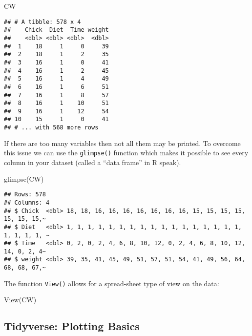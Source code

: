 \documentclass[
]{book}
\newenvironment{Shaded}{\begin{snugshade}}{\end{snugshade}}
\newcommand{\FunctionTok}[1]{\textcolor[rgb]{0.00,0.00,0.00}{#1}}
\newcommand{\NormalTok}[1]{#1}
\begin{document}
\begin{Shaded}
\begin{Highlighting}[]
\NormalTok{CW}
\end{Highlighting}
\end{Shaded}

\begin{verbatim}
## # A tibble: 578 x 4
##    Chick  Diet  Time weight
##    <dbl> <dbl> <dbl>  <dbl>
##  1    18     1     0     39
##  2    18     1     2     35
##  3    16     1     0     41
##  4    16     1     2     45
##  5    16     1     4     49
##  6    16     1     6     51
##  7    16     1     8     57
##  8    16     1    10     51
##  9    16     1    12     54
## 10    15     1     0     41
## # ... with 568 more rows
\end{verbatim}

If there are too many variables then not all them may be printed. To overcome this issue
we can use the \texttt{glimpse()} function which makes it possible to see every column in your
dataset (called a ``data frame'' in R speak).

\begin{Shaded}
\begin{Highlighting}[]
\FunctionTok{glimpse}\NormalTok{(CW)}
\end{Highlighting}
\end{Shaded}

\begin{verbatim}
## Rows: 578
## Columns: 4
## $ Chick  <dbl> 18, 18, 16, 16, 16, 16, 16, 16, 16, 15, 15, 15, 15, 15, 15, 15,~
## $ Diet   <dbl> 1, 1, 1, 1, 1, 1, 1, 1, 1, 1, 1, 1, 1, 1, 1, 1, 1, 1, 1, 1, 1, ~
## $ Time   <dbl> 0, 2, 0, 2, 4, 6, 8, 10, 12, 0, 2, 4, 6, 8, 10, 12, 14, 0, 2, 4~
## $ weight <dbl> 39, 35, 41, 45, 49, 51, 57, 51, 54, 41, 49, 56, 64, 68, 68, 67,~
\end{verbatim}

The function \texttt{View()} allows for a spread-sheet type of view on the data:

\begin{Shaded}
\begin{Highlighting}[]
\FunctionTok{View}\NormalTok{(CW)}
\end{Highlighting}
\end{Shaded}

\hypertarget{tidyverse-plotting-basics}{%
\subsection{Tidyverse: Plotting Basics}\label{tidyverse-plotting-basics}}
\end{document}
